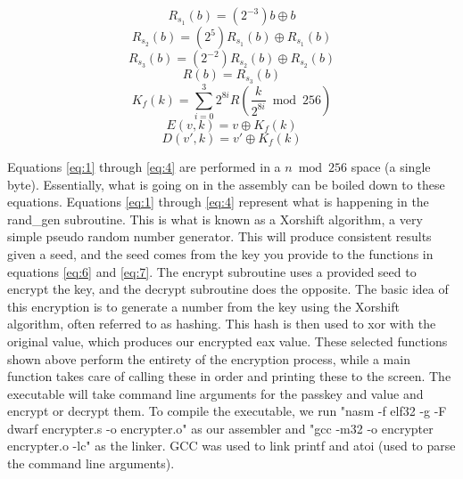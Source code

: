 \documentclass[11pt]{article}
\begin{document}
\begin{multicols}{2}

\begin{equation} \label{eq:1}
    R_{s_1}(b) = (2^{-3})b \oplus b 
\end{equation}
\begin{equation} \label{eq:2}
    R_{s_2}(b) = (2^{5})R_{s_1}(b) \oplus R_{s_1}(b)
\end{equation}
\begin{equation} \label{eq:3}
    R_{s_3}(b) = (2^{-2})R_{s_2}(b) \oplus R_{s_2}(b) 
\end{equation}
\begin{equation} \label{eq:4}
    R(b) = R_{s_3}(b)
\end{equation}
\begin{equation} \label{eq:5}
    K_f(k) = \sum_{i=0}^3 2^{8i}R\left(\frac{k}{2^{8i}} \bmod 256\right)
\end{equation}
\begin{equation} \label{eq:6}
    E(v, k) = v \oplus K_f(k)
\end{equation}
\begin{equation} \label{eq:7}
    D(v', k) = v' \oplus K_f(k)
\end{equation}

\end{multicols}

Equations \ref{eq:1} through \ref{eq:4} are performed in a $n \bmod 256$ space (a single byte). Essentially, what is going on in the assembly can be boiled down to these equations. Equations \ref{eq:1} through \ref{eq:4} represent what is happening in the rand\_gen subroutine. This is what is known as a Xorshift algorithm, a very simple pseudo random number generator. This will produce consistent results given a seed, and the seed comes from the key you provide to the functions in equations \ref{eq:6} and \ref{eq:7}. The encrypt subroutine uses a provided seed to encrypt the key, and the decrypt subroutine does the opposite. The basic idea of this encryption is to generate a number from the key using the Xorshift algorithm, often referred to as hashing. This hash is then used to xor with the original value, which produces our encrypted eax value. These selected functions shown above perform the entirety of the encryption process, while a main function takes care of calling these in order and printing these to the screen. The executable will take command line arguments for the passkey and value and encrypt or decrypt them. To compile the executable, we run "nasm -f elf32 -g -F dwarf encrypter.s -o encrypter.o" as our assembler and "gcc -m32 -o encrypter encrypter.o -lc" as the linker. GCC was used to link printf and atoi (used to parse the command line arguments). 
\end{document}
